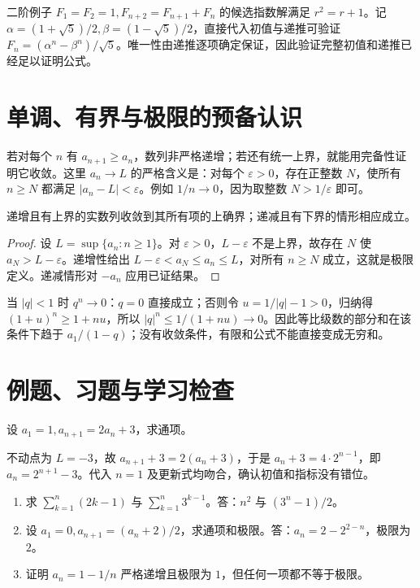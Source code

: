 \documentclass[UTF8]{ctexbook}
\begin{document}
二阶例子 $F_1=F_2=1,F_{n+2}=F_{n+1}+F_n$ 的候选指数解满足 $r^2=r+1$。记 $\alpha=(1+\sqrt5)/2,\beta=(1-\sqrt5)/2$，直接代入初值与递推可验证 $F_n=(\alpha^n-\beta^n)/\sqrt5$。唯一性由递推逐项确定保证，因此验证完整初值和递推已经足以证明公式。

\section{单调、有界与极限的预备认识}
若对每个 $n$ 有 $a_{n+1}\ge a_n$，数列非严格递增；若还有统一上界，就能用完备性证明它收敛。这里 $a_n\to L$ 的严格含义是：对每个 $\varepsilon>0$，存在正整数 $N$，使所有 $n\ge N$ 都满足 $|a_n-L|<\varepsilon$。例如 $1/n\to0$，因为取整数 $N>1/\varepsilon$ 即可。

\begin{theorem}[单调有界收敛]
递增且有上界的实数列收敛到其所有项的上确界；递减且有下界的情形相应成立。
\end{theorem}
\begin{proof}
设 $L=\sup\{a_n:n\ge1\}$。对 $\varepsilon>0$，$L-\varepsilon$ 不是上界，故存在 $N$ 使 $a_N>L-\varepsilon$。递增性给出 $L-\varepsilon<a_N\le a_n\le L$，对所有 $n\ge N$ 成立，这就是极限定义。递减情形对 $-a_n$ 应用已证结果。
\end{proof}
当 $|q|<1$ 时 $q^n\to0$：$q=0$ 直接成立；否则令 $u=1/|q|-1>0$，归纳得 $(1+u)^n\ge1+nu$，所以 $|q|^n\le1/(1+nu)\to0$。因此等比级数的部分和在该条件下趋于 $a_1/(1-q)$；没有收敛条件，有限和公式不能直接变成无穷和。

\section{例题、习题与学习检查}
\begin{example}
设 $a_1=1,a_{n+1}=2a_n+3$，求通项。
\end{example}
\begin{solve}
不动点为 $L=-3$，故 $a_{n+1}+3=2(a_n+3)$，于是 $a_n+3=4\cdot2^{n-1}$，即 $a_n=2^{n+1}-3$。代入 $n=1$ 及更新式均吻合，确认初值和指标没有错位。
\end{solve}
\begin{enumerate}
\item 求 $\sum_{k=1}^n(2k-1)$ 与 $\sum_{k=1}^n3^{k-1}$。答：$n^2$ 与 $(3^n-1)/2$。
\item 设 $a_1=0,a_{n+1}=(a_n+2)/2$，求通项和极限。答：$a_n=2-2^{2-n}$，极限为 $2$。
\item 证明 $a_n=1-1/n$ 严格递增且极限为 $1$，但任何一项都不等于极限。
\end{enumerate}
\end{document}
